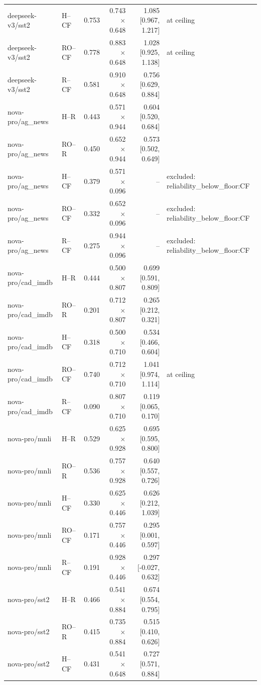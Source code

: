 \begin{table}[t]
\begin{tabular}{llrrrl}
deepseek-v3/sst2 & H--CF & 0.753 & 0.743$\times$0.648 & 1.085 [0.967, 1.217] & at ceiling \\
deepseek-v3/sst2 & RO--CF & 0.778 & 0.883$\times$0.648 & 1.028 [0.925, 1.138] & at ceiling \\
deepseek-v3/sst2 & R--CF & 0.581 & 0.910$\times$0.648 & 0.756 [0.629, 0.884] &  \\
nova-pro/ag_news & H--R & 0.443 & 0.571$\times$0.944 & 0.604 [0.520, 0.684] &  \\
nova-pro/ag_news & RO--R & 0.450 & 0.652$\times$0.944 & 0.573 [0.502, 0.649] &  \\
nova-pro/ag_news & H--CF & 0.379 & 0.571$\times$0.096 & -- & excluded: reliability\_below\_floor:CF \\
nova-pro/ag_news & RO--CF & 0.332 & 0.652$\times$0.096 & -- & excluded: reliability\_below\_floor:CF \\
nova-pro/ag_news & R--CF & 0.275 & 0.944$\times$0.096 & -- & excluded: reliability\_below\_floor:CF \\
nova-pro/cad_imdb & H--R & 0.444 & 0.500$\times$0.807 & 0.699 [0.591, 0.809] &  \\
nova-pro/cad_imdb & RO--R & 0.201 & 0.712$\times$0.807 & 0.265 [0.212, 0.321] &  \\
nova-pro/cad_imdb & H--CF & 0.318 & 0.500$\times$0.710 & 0.534 [0.466, 0.604] &  \\
nova-pro/cad_imdb & RO--CF & 0.740 & 0.712$\times$0.710 & 1.041 [0.974, 1.114] & at ceiling \\
nova-pro/cad_imdb & R--CF & 0.090 & 0.807$\times$0.710 & 0.119 [0.065, 0.170] &  \\
nova-pro/mnli & H--R & 0.529 & 0.625$\times$0.928 & 0.695 [0.595, 0.800] &  \\
nova-pro/mnli & RO--R & 0.536 & 0.757$\times$0.928 & 0.640 [0.557, 0.726] &  \\
nova-pro/mnli & H--CF & 0.330 & 0.625$\times$0.446 & 0.626 [0.212, 1.039] &  \\
nova-pro/mnli & RO--CF & 0.171 & 0.757$\times$0.446 & 0.295 [0.001, 0.597] &  \\
nova-pro/mnli & R--CF & 0.191 & 0.928$\times$0.446 & 0.297 [-0.027, 0.632] &  \\
nova-pro/sst2 & H--R & 0.466 & 0.541$\times$0.884 & 0.674 [0.554, 0.795] &  \\
nova-pro/sst2 & RO--R & 0.415 & 0.735$\times$0.884 & 0.515 [0.410, 0.626] &  \\
nova-pro/sst2 & H--CF & 0.431 & 0.541$\times$0.648 & 0.727 [0.571, 0.884] &  \\

\end{tabular}
\end{table}
